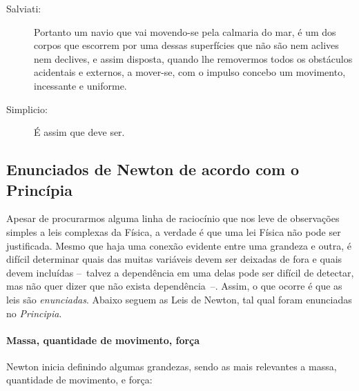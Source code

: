 \begin{description}
\item[Salviati:] Portanto um navio que vai movendo-se pela calmaria do mar, é um dos corpos que escorrem por uma dessas superfícies que não são nem aclives nem declives, e assim disposta, quando lhe removermos todos os obstáculos acidentais e externos, a mover-se, com o impulso concebo um movimento, incessante e uniforme.

\item[Simplicio:] É assim que deve ser.

\end{description}

\subsection{Enunciados de Newton de acordo com o Princípia}
\label{Sec:EnunciadosNewton}

Apesar de procurarmos alguma linha de raciocínio que nos leve de observações simples a leis complexas da Física, a verdade é que uma lei Física não pode ser justificada. Mesmo que haja uma conexão evidente entre uma grandeza e outra, é difícil determinar quais das muitas variáveis devem ser deixadas de fora e quais devem incluídas --~talvez a dependência em uma delas pode ser difícil de detectar, mas não quer dizer que não exista dependência~--. Assim, o que ocorre é que as leis são \emph{enunciadas}. Abaixo seguem as Leis de Newton, tal qual foram enunciadas no \emph{Principia}.

\paragraph{Massa, quantidade de movimento, força}

Newton inicia definindo algumas grandezas, sendo as mais relevantes a massa, quantidade de movimento, e força:

